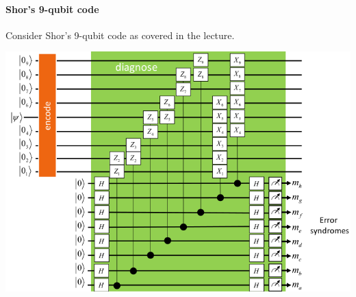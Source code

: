 \documentclass[12pt]{article}
\begin{document}
\paragraph{Shor's 9-qubit code} \hfill

Consider Shor's 9-qubit code as covered in the lecture.

\begin{center}\includegraphics[width=1\textwidth]{problem-3.png}\end{center}
\end{document}
